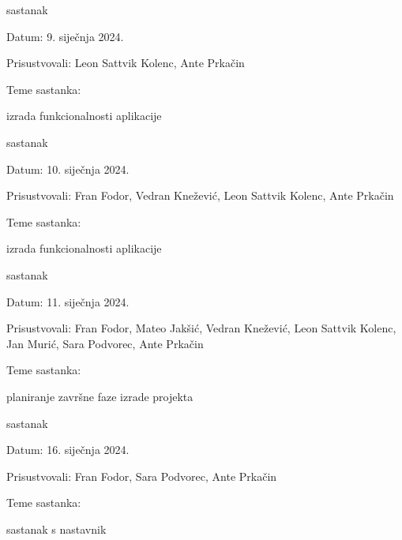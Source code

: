 \begin{packed_enum}
			\item  sastanak
			\item[] \begin{packed_item}
				\item Datum: {9. siječnja 2024.}
				\item Prisustvovali: {Leon Sattvik Kolenc, Ante Prkačin}
				\item Teme sastanka:
				\begin{packed_item}
					\item  izrada funkcionalnosti aplikacije
				\end{packed_item}
			\end{packed_item}

			\item  sastanak
			\item[] \begin{packed_item}
				\item Datum: {10. siječnja 2024.}
				\item Prisustvovali: {Fran Fodor, Vedran Knežević, Leon Sattvik Kolenc, Ante Prkačin}
				\item Teme sastanka:
				\begin{packed_item}
					\item  izrada funkcionalnosti aplikacije
				\end{packed_item}
			\end{packed_item}

			\item  sastanak
			\item[] \begin{packed_item}
				\item Datum: {11. siječnja 2024.}
				\item Prisustvovali: {Fran Fodor, Mateo Jakšić, Vedran Knežević, Leon Sattvik Kolenc, Jan Murić, Sara Podvorec, Ante Prkačin}
				\item Teme sastanka:
				\begin{packed_item}
					\item  planiranje završne faze izrade projekta
				\end{packed_item}
			\end{packed_item}
			
			\item  sastanak
			\item[] \begin{packed_item}
				\item Datum: {16. siječnja 2024.}
				\item Prisustvovali: {Fran Fodor, Sara Podvorec, Ante Prkačin}
				\item Teme sastanka:
				\begin{packed_item}
					\item  sastanak s nastavnik
				\end{packed_item}
			\end{packed_item}

			
		\end{packed_enum}
		
